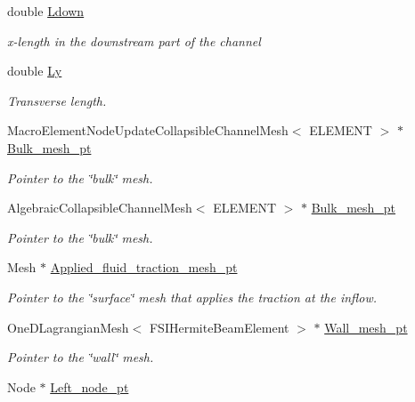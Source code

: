 \begin{DoxyCompactItemize}
double \hyperlink{classFSICollapsibleChannelProblem_a0964686847cc64f2a77a866187aec626}{Ldown}
\begin{DoxyCompactList}\small\item\em x-\/length in the downstream part of the channel \end{DoxyCompactList}\item 
double \hyperlink{classFSICollapsibleChannelProblem_adb381270408cea69b7290ff2aeb5928f}{Ly}
\begin{DoxyCompactList}\small\item\em Transverse length. \end{DoxyCompactList}\item 
Macro\+Element\+Node\+Update\+Collapsible\+Channel\+Mesh$<$ E\+L\+E\+M\+E\+NT $>$ $\ast$ \hyperlink{classFSICollapsibleChannelProblem_ab2eb47a9ed4ce8adb3b11ac316644cde}{Bulk\+\_\+mesh\+\_\+pt}
\begin{DoxyCompactList}\small\item\em Pointer to the \char`\"{}bulk\char`\"{} mesh. \end{DoxyCompactList}\item 
Algebraic\+Collapsible\+Channel\+Mesh$<$ E\+L\+E\+M\+E\+NT $>$ $\ast$ \hyperlink{classFSICollapsibleChannelProblem_a74c09286f4ad4242c37b6ea16c069fae}{Bulk\+\_\+mesh\+\_\+pt}
\begin{DoxyCompactList}\small\item\em Pointer to the \char`\"{}bulk\char`\"{} mesh. \end{DoxyCompactList}\item 
Mesh $\ast$ \hyperlink{classFSICollapsibleChannelProblem_a0594bd63457b032bcf2a1b6bba534c7e}{Applied\+\_\+fluid\+\_\+traction\+\_\+mesh\+\_\+pt}
\begin{DoxyCompactList}\small\item\em Pointer to the \char`\"{}surface\char`\"{} mesh that applies the traction at the inflow. \end{DoxyCompactList}\item 
One\+D\+Lagrangian\+Mesh$<$ F\+S\+I\+Hermite\+Beam\+Element $>$ $\ast$ \hyperlink{classFSICollapsibleChannelProblem_a2699abcfe8de6b73bbef098e0f0dc1db}{Wall\+\_\+mesh\+\_\+pt}
\begin{DoxyCompactList}\small\item\em Pointer to the \char`\"{}wall\char`\"{} mesh. \end{DoxyCompactList}\item 
Node $\ast$ \hyperlink{classFSICollapsibleChannelProblem_a0e5fd455e2956e74485678d4357b4869}{Left\+\_\+node\+\_\+pt}

\end{DoxyCompactItemize}
